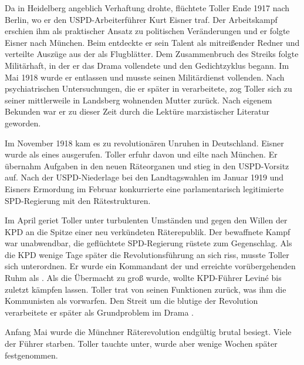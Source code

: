 Da in Heidelberg angeblich Verhaftung drohte, flüchtete Toller Ende 1917 nach
Berlin, wo er den USPD-Arbeiterführer Kurt Eisner traf. Der Arbeitskampf
erschien ihm als praktischer Ansatz zu politischen Veränderungen und er folgte
Eisner nach München. Beim \Cite{Munitionsarbeiter-Streik} entdeckte er sein
Talent als mitreißender Redner und verteilte Auszüge aus der \Cite{Wandlung}
als Flugblätter. Dem Zusammenbruch des Streiks folgte Militärhaft, in der er
das Drama vollendete und den Gedichtzyklus \Cite{Lieder der
  Gefangenen}
begann. Im Mai 1918 wurde er entlassen und musste seinen Militärdienst
vollenden.  Nach psychiatrischen Untersuchungen, die er später in
\Cite{Hoppla, wir leben!} verarbeitete, zog Toller sich zu seiner mittlerweile
in Landsberg wohnenden Mutter zurück. Nach eigenem Bekunden war er zu dieser
Zeit durch die Lektüre marxistischer Literatur \Cite{überzeugter Sozialist}
geworden.


Im November 1918 kam es zu revolutionären Unruhen in Deutschland.  Eisner
wurde als \Cite{Ministerpräsident} eines \Cite{Volksstaates Bayern}
ausgerufen. Toller erfuhr davon und eilte nach München. Er übernahm Aufgaben
in den neuen Räteorganen und stieg in den USPD-Vorsitz auf.  Nach der
USPD-Niederlage bei den Landtagswahlen im Januar 1919 und Eisners Ermordung im
Februar konkurrierte eine parlamentarisch legitimierte SPD-Regierung mit den
Rätestrukturen.

Im April geriet Toller unter turbulenten Umständen und gegen den Willen der
KPD an die Spitze einer neu verkündeten Räterepublik. Der bewaffnete Kampf war
unabwendbar, die geflüchtete SPD-Regierung rüstete zum Gegenschlag. Als die
KPD wenige Tage später die Revolutionsführung an sich riss, musste Toller sich
unterordnen. Er wurde ein Kommandant der \Cite{roten Truppen} und erreichte
vorübergehenden Ruhm als \Cite{Sieger von Dachau}. Als die Übermacht zu groß
wurde, wollte KPD-Führer Leviné bis zuletzt kämpfen lassen. Toller trat von
seinen Funktionen zurück, was ihm die Kommunisten als \Cite{Verrat}
vorwarfen. Den Streit um die blutige \Cite{Opferbereitschaft} der Revolution
verarbeitete er später als Grundproblem im Drama \Cite{Masse
  Mensch}.

Anfang Mai wurde die Münchner Räterevolution endgültig brutal besiegt.  Viele
der Führer starben. Toller tauchte unter, wurde aber wenige Wochen später
festgenommen.

